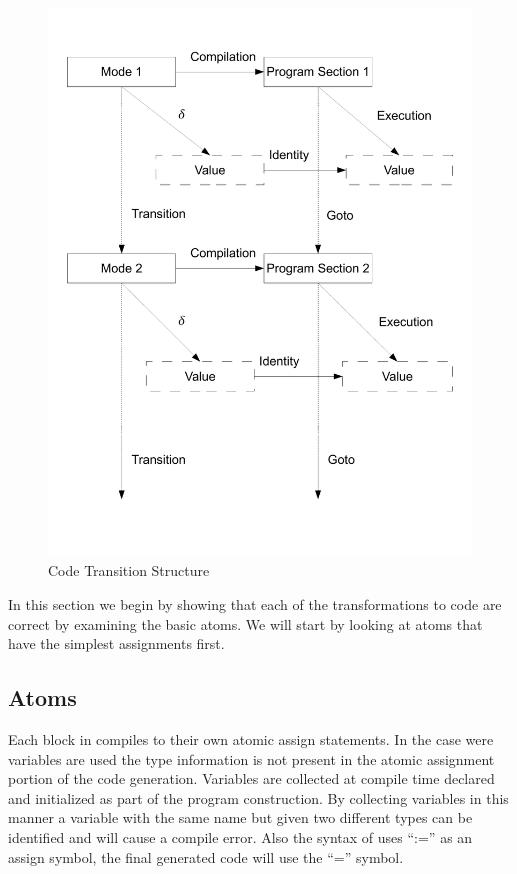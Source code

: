 \begin{figure}[htb]
    \centering
    \includegraphics[trim= 10mm 30mm 10mm 10mm, clip, width=\imgmedium]{./images/correctness_graph2.pdf}
    \caption{Code Transition Structure}
    \label{fig:correctness_graph2}
\end{figure}

In this section we begin by showing that each of the transformations to code are 
correct by examining the basic atoms. We will start by looking at atoms that have the 
simplest assignments first.

\clearpage
\subsection{Atoms}

Each block in \plccharts compiles to their own atomic assign statements.
In the case were variables are used the type information is not present in 
the atomic assignment portion of the code generation. 
Variables are collected at compile time declared and initialized as part of 
the program construction. By collecting variables in this manner a variable 
with the same name but given two different types can be identified and will 
cause a compile error. Also the syntax of \plccharts uses ``:='' as an 
assign symbol, the final generated code will use the ``='' symbol.


